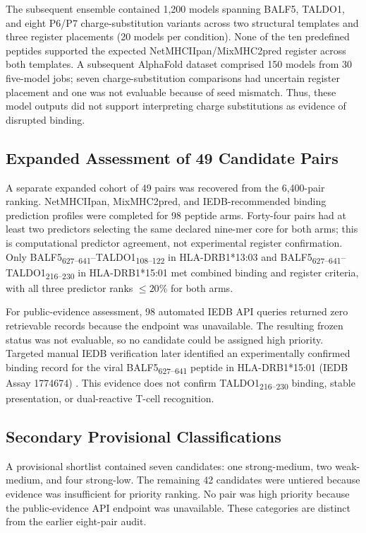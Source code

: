 \documentclass[11pt]{article}
\newcommand{\pep}[2]{#1\textsubscript{#2}}
\begin{document}
The subsequent ensemble contained 1,200 models spanning BALF5, TALDO1, and eight P6/P7 charge-substitution variants across two structural templates and three register placements (20 models per condition). None of the ten predefined peptides supported the expected NetMHCIIpan/MixMHC2pred register across both templates. A subsequent AlphaFold dataset comprised 150 models from 30 five-model jobs; seven charge-substitution comparisons had uncertain register placement and one was not evaluable because of seed mismatch. Thus, these model outputs did not support interpreting charge substitutions as evidence of disrupted binding.

\subsection{Expanded Assessment of 49 Candidate Pairs}
A separate expanded cohort of 49 pairs was recovered from the 6,400-pair ranking. NetMHCIIpan, MixMHC2pred, and IEDB-recommended binding prediction profiles were completed for 98 peptide arms. Forty-four pairs had at least two predictors selecting the same declared nine-mer core for both arms; this is computational predictor agreement, not experimental register confirmation. Only \pep{BALF5}{627--641}--\pep{TALDO1}{108--122} in HLA-DRB1*13:03 and \pep{BALF5}{627--641}--\pep{TALDO1}{216--230} in HLA-DRB1*15:01 met combined binding and register criteria, with all three predictor ranks $\leq20\%$ for both arms.

For public-evidence assessment, 98 automated IEDB API queries returned zero retrievable records because the endpoint was unavailable. The resulting frozen status was not evaluable, so no candidate could be assigned high priority. Targeted manual IEDB verification later identified an experimentally confirmed binding record for the viral \pep{BALF5}{627--641} peptide in HLA-DRB1*15:01 (IEDB Assay 1774674) \cite{iedb,hansen}. This evidence does not confirm TALDO1\textsubscript{216--230} binding, stable presentation, or dual-reactive T-cell recognition.

\subsection{Secondary Provisional Classifications}
A provisional shortlist contained seven candidates: one strong-medium, two weak-medium, and four strong-low. The remaining 42 candidates were untiered because evidence was insufficient for priority ranking. No pair was high priority because the public-evidence API endpoint was unavailable. These categories are distinct from the earlier eight-pair audit.
\end{document}
